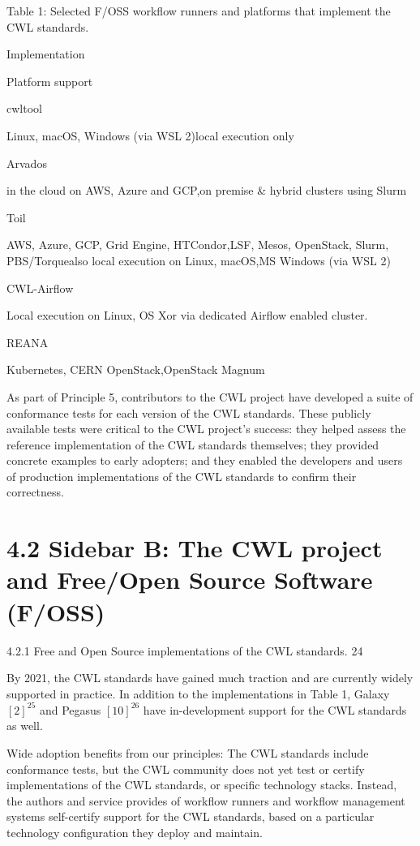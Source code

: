 \documentclass[
]{article}
\begin{document}
Table 1: Selected F/OSS workflow runners and platforms that implement
the CWL standards.

Implementation

Platform support

cwltool

Linux, macOS, Windows (via WSL 2)local execution only

Arvados

in the cloud on AWS, Azure and GCP,on premise \& hybrid clusters using
Slurm

Toil

AWS, Azure, GCP, Grid Engine, HTCondor,LSF, Mesos, OpenStack, Slurm,
PBS/Torquealso local execution on Linux, macOS,MS Windows (via WSL 2)

CWL-Airflow

Local execution on Linux, OS Xor via dedicated Airflow enabled cluster.

REANA

Kubernetes, CERN OpenStack,OpenStack Magnum

As part of Principle 5, contributors to the CWL project have developed a
suite of conformance tests for each version of the CWL standards. These
publicly available tests were critical to the CWL project's success:
they helped assess the reference implementation of the CWL standards
themselves; they provided concrete examples to early adopters; and they
enabled the developers and users of production implementations of the
CWL standards to confirm their correctness.

\section{4.2 Sidebar B: The CWL project and Free/Open Source Software
(F/OSS)}\label{sidebar-b-the-cwl-project-and-freeopen-source-software-foss}

4.2.1 Free and Open Source implementations of the CWL standards. 24

By 2021, the CWL standards have gained much traction and are currently
widely supported in practice. In addition to the implementations in
Table 1, Galaxy \([2]^{25}\) and Pegasus \([10]^{26}\) have
in-development support for the CWL standards as well.

Wide adoption benefits from our principles: The CWL standards include
conformance tests, but the CWL community does not yet test or certify
implementations of the CWL standards, or specific technology stacks.
Instead, the authors and service provides of workflow runners and
workflow management systems self-certify support for the CWL standards,
based on a particular technology configuration they deploy and maintain.
\end{document}
